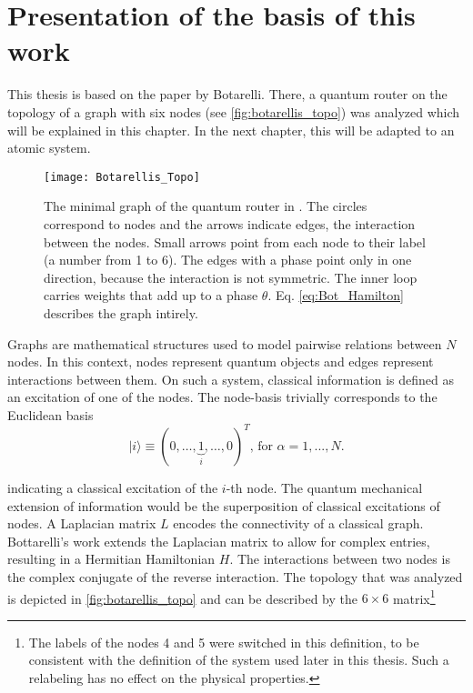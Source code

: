 \chapter{Presentation of the basis of this work} \label{Chapter3}
This thesis is based on the paper \cite{Startingpoint} by Botarelli.
There, a quantum router on the topology of a graph with six nodes
(see \autoref{fig:botarellis_topo}) was analyzed which will be explained in this chapter.
In the next chapter, this will be adapted to an atomic system.

\begin{figure}[!ht]
    \centering
    \texttt{[image: Botarellis\_Topo]}
    \caption{The minimal graph of the quantum router in \cite{Startingpoint}.
    The circles correspond to nodes and the arrows indicate edges, the interaction between the nodes.
    Small arrows point from each node to their label (a number from 1 to 6).
    The edges with a phase point only in one direction, because the interaction is not symmetric.
    The inner loop carries weights that add up to a phase $\theta$.
    Eq. \eqref{eq:Bot_Hamilton} describes the graph intirely.}
    \label{fig:botarellis_topo}
\end{figure}

\noindent
Graphs are mathematical structures used to model pairwise relations between $N$ nodes.
In this context, nodes represent quantum objects and edges represent interactions between them.
On such a system, classical information is defined as an excitation of one of the nodes.
The node-basis trivially corresponds to the Euclidean basis
\begin{equation}
\vert i\rangle\equiv(0,\dots,\underbrace{1}_{i},\dots,0)^T\text{, for } \alpha = 1, ..., N.
\end{equation}

\noindent
indicating a classical excitation of the $i$-th node.
The quantum mechanical extension of information would be the superposition of classical excitations of nodes.
A Laplacian matrix $ L $ encodes the connectivity of a classical graph.
Bottarelli's work extends the Laplacian matrix to allow for complex entries, resulting in a Hermitian Hamiltonian $ H $.
The interactions between two nodes is the complex conjugate of the reverse interaction.
The topology that was analyzed is depicted in \autoref{fig:botarellis_topo} and can be described by the $ 6 \times 6 $ matrix\footnote{The labels of the nodes 4 and 5 were switched in this definition,
    to be consistent with the definition of the system used later in this thesis.
    Such a relabeling has no effect on the physical properties.}

